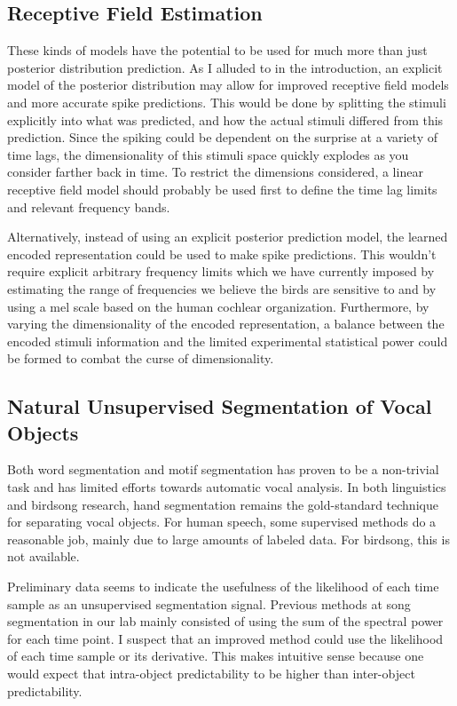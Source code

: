 \subsection{Receptive Field Estimation}
These kinds of models have the potential to be used for much more than just posterior distribution prediction. As I alluded to in the introduction, an explicit model of the posterior distribution may allow for improved receptive field models and more accurate spike predictions. This would be done by splitting the stimuli explicitly into what was predicted, and how the actual stimuli differed from this prediction. Since the spiking could be dependent on the surprise at a variety of time lags, the dimensionality of this stimuli space quickly explodes as you consider farther back in time. To restrict the dimensions considered, a linear receptive field model should probably be used first to define the time lag limits and relevant frequency bands.

Alternatively, instead of using an explicit posterior prediction model, the learned \CPC encoded representation could be used to make spike predictions. This wouldn't require explicit arbitrary frequency limits which we have currently imposed by estimating the range of frequencies we believe the birds are sensitive to and by using a mel scale based on the human cochlear organization. Furthermore, by varying the dimensionality of the \CPC encoded representation, a balance between the encoded stimuli information and the limited experimental statistical power could be formed to combat the curse of dimensionality.

\subsection{Natural Unsupervised Segmentation of Vocal Objects}
Both word segmentation and motif segmentation has proven to be a non-trivial task and has limited efforts towards automatic vocal analysis. In both linguistics and birdsong research, hand segmentation remains the gold-standard technique for separating vocal objects. For human speech, some supervised methods do a reasonable job, mainly due to large amounts of labeled data. For birdsong, this is not available.

Preliminary data seems to indicate the usefulness of the likelihood of each time sample as an unsupervised segmentation signal. Previous methods at song segmentation in our lab mainly consisted of using the sum of the spectral power for each time point. I suspect that an improved method could use the likelihood of each time sample or its derivative. This makes intuitive sense because one would expect that intra-object predictability to be higher than inter-object predictability.

